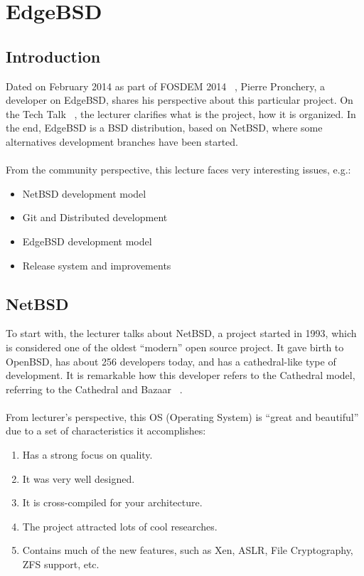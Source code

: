 \documentclass[11pt]{article}
\begin{document}
\pagebreak

\section{EdgeBSD}
\label{sec:edgebsd}
\subsection{Introduction}
Dated on February 2014 as part of FOSDEM 2014 ~\cite{FOSS00}, Pierre Pronchery, a developer on EdgeBSD, shares his perspective about this particular project. On the Tech Talk ~\cite{TALK07}, the lecturer clarifies what is the project, how it is organized. In the end, EdgeBSD is a BSD distribution, based on NetBSD, where some alternatives development branches have been started.\\
\\
From the community perspective, this lecture faces very interesting issues, e.g.:
\begin{itemize}
\item{NetBSD development model}
\item{Git and Distributed development}
\item{EdgeBSD development model}
\item{Release system and improvements}
\end{itemize}

\subsection{NetBSD}

To start with, the lecturer talks about NetBSD, a project started in 1993, which is considered one of the oldest ``modern'' open source project. It gave birth to OpenBSD, has about 256 developers today, and has a cathedral-like type of development. It is remarkable how this developer refers to the Cathedral model, referring to the Cathedral and Bazaar ~\cite{CATH00}.\\
\\
From lecturer's perspective, this OS (Operating System) is ``great and beautiful'' due to a set of characteristics it accomplishes:
\begin{enumerate}\itemsep0pt
\item{Has a strong focus on quality}.
\item{It was very well designed}.
\item{It is cross-compiled for your architecture}.
\item{The project attracted lots of cool researches}.
\item{Contains much of the new features, such as Xen, ASLR, File Cryptography, ZFS support, etc}.
\end{enumerate}\itemsep0pt
\end{document}
